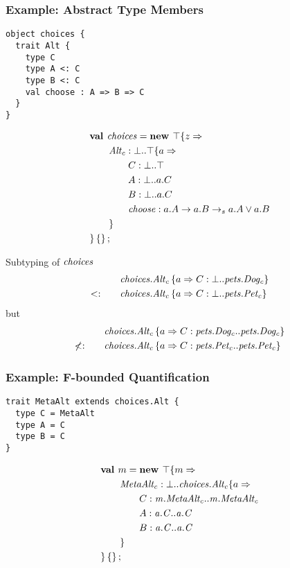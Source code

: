 \documentclass{beamer}
\begin{document}
\begin{frame}[fragile]
\frametitle{Example: Abstract Type Members}
\begin{verbatim}
object choices {
  trait Alt {
    type C
    type A <: C
    type B <: C
    val choose : A => B => C
  }
}
\end{verbatim}
\begin{align*}
&\textbf{val }\mathit{choices} = \textbf{new }\top \{z \Rightarrow \\
&\quad\quad\mathit{Alt_c} : \bot..\top \{a \Rightarrow \\
&\quad\quad\quad\quad C : \bot..\top\\
&\quad\quad\quad\quad A : \bot..a.C\\
&\quad\quad\quad\quad B : \bot..a.C\\
&\quad\quad\quad\quad\mathit{choose} : a.A \rightarrow a.B\rightarrow_sa.A \vee a.B\\
&\quad\quad \}\\
& \}\left\{\right\} ;\;
\end{align*}
\end{frame}

\begin{frame}[fragile]{Subtyping of $\mathit{choices}$}
\begin{align*}
&{\mathit{choices.Alt_c} \left\{a \Rightarrow C : \bot..\mathit{pets.Dog_c} \right\}}\\
<:\quad\quad&{\mathit{choices.Alt_c} \left\{a \Rightarrow C : \bot..\mathit{pets.Pet_c} \right\}}
\end{align*}
but
\begin{align*}
&{\mathit{choices.Alt_c} \left\{a \Rightarrow C : \mathit{pets.Dog_c}..\mathit{pets.Dog_c} \right\}}\\
\not<:\quad\quad&{\mathit{choices.Alt_c} \left\{a \Rightarrow C : \mathit{pets.Pet_c}..\mathit{pets.Pet_c} \right\}}
\end{align*}
\end{frame}

\begin{frame}[fragile]
\frametitle{Example: F-bounded Quantification}
\begin{verbatim}
trait MetaAlt extends choices.Alt {
  type C = MetaAlt
  type A = C
  type B = C
}
\end{verbatim}
\begin{align*}
&\textbf{val }m = \textbf{new }\top \{m \Rightarrow \\
&\quad\quad\mathit{MetaAlt_c} : \bot..{\mathit{choices.Alt_c}} \{a \Rightarrow \\
&\quad\quad\quad\quad C : \mathit{m.MetaAlt_c}..\mathit{m.MetaAlt_c}\\
&\quad\quad\quad\quad A : \mathit{a.C}..\mathit{a.C}\\
&\quad\quad\quad\quad B : \mathit{a.C}..\mathit{a.C}\\
&\quad\quad \}\\
& \}\left\{\right\} ;\;\\&
\end{align*}
\end{frame}
\end{document}
